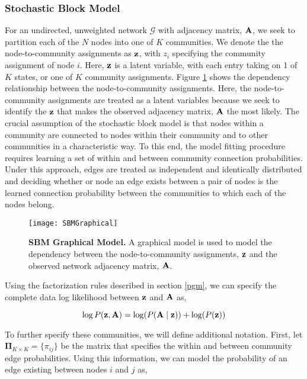 \subsubsection{Stochastic Block Model}
For an undirected, unweighted network $\mathcal{G}$ with adjacency matrix, ${\bf A}$, we seek to partition each of the $N$ nodes into one of $K$ communities. We denote the the node-to-community assignments as ${\bf z}$, with $z_{i}$ specifying the community assignment of node $i$. Here, ${\bf z}$ is a latent variable, with each entry taking on 1 of $K$ states, or one of $K$ community assignments. Figure \ref{fig:graphical} shows the dependency relationship between the node-to-community assignments. Here, the node-to-community assignments are treated as a latent variables because we seek to identify the ${\bf z}$ that makes the observed adjacency matrix, ${\bf A}$ the most likely.  The crucial assumption of the stochastic block model is that nodes within a community are connected to nodes within their community and to other communities in a characteristic way. To this end, the model fitting procedure requires learning a set of within and between community connection probabilities. Under this approach, edges are treated as independent and identically distributed and deciding whether or node an edge exists between a pair of nodes is the learned connection probability between the communities to which each of the nodes belong.

\begin{figure}
\begin{center}
\texttt{[image: SBMGraphical]}
\caption{{\bf SBM Graphical Model.} A graphical model is used to model the dependency between the node-to-community assignments, ${\bf z}$ and the observed network adjacency matrix, ${\bf A}$.}
\label{fig:graphical}
\end{center}
\end{figure}

Using the factorization rules described in section \ref{pgm}, we can specify the complete data log likelihood between ${\bf z}$ and ${\bf A}$ as,

\begin{equation}
\log P({\bf z},{\bf A})=\log(P({\bf A} \mid {\bf z}))+\log(P({\bf z}))
\end{equation}

To further specify these communities, we will define additional notation. First, let ${\boldsymbol \Pi}_{K \times K}=\{\pi_{ij}\}$ be the matrix that specifies the within and between community edge probabilities. Using this information, we can model the probability of an edge existing between nodes $i$ and $j$ as,

